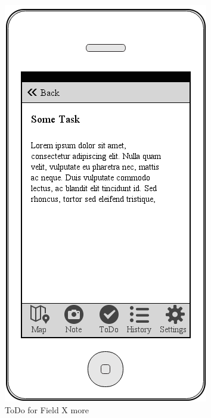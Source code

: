 \documentclass[12pt]{article}
\begin{document}
\begin{figure}[ht]
	\includegraphics[width=\linewidth, height=0.4\textheight, keepaspectratio=true]{mockups/ToDoFieldXMore.png}
	\caption{ToDo for Field X more}
	\endminipage\hfill
\end{figure}
\end{document}

